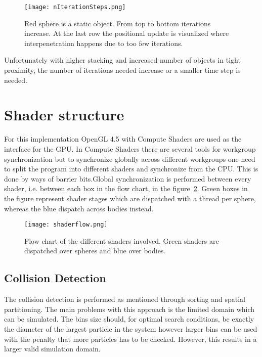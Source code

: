 \begin{figure}[H]
  \centering
  \texttt{[image: nIterationSteps.png]}
  \caption{Red sphere is a static object. From top to bottom iterations increase. At the last row the positional update is visualized where interpenetration happens due to too few iterations.}
  \label{fig:iters}
\end{figure}

Unfortunately with higher stacking and increased number of objects in tight proximity,
the number of iterations needed increase or a smaller time step is needed.

\section{Shader structure}
For this implementation OpenGL 4.5 with Compute Shaders are used as the interface
for the GPU. In Compute Shaders there are several tools for workgroup synchronization
but to synchronize globally across different workgroups one need to split the program into
different shaders and synchronize from the CPU. This is done by ways of barrier bits.Global synchronization
is performed between every shader, i.e. between each box in the flow chart, in the figure~\ref{fig:flow}. Green
boxes in the figure represent shader stages which are dispatched with a thread per
sphere, whereas the blue dispatch across bodies instead.

\begin{figure}[H]
  \centering
  \texttt{[image: shaderflow.png]}
  \caption{Flow chart of the different shaders involved. Green shaders are dispatched over spheres and blue over bodies.}
  \label{fig:flow}
\end{figure}

\subsection{Collision Detection}
The collision detection is performed as mentioned through sorting and spatial partitioning.
The main problems with this approach is the limited domain which can be simulated.
The bins size should, for optimal search conditions, be exactly the diameter of the largest
particle in the system however larger bins can be used with the penalty that more
particles has to be checked. However, this results in a larger valid simulation domain.

